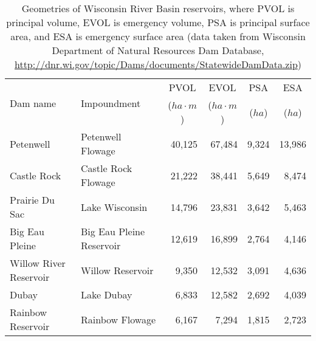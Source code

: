\begin{table}[h!]
	\caption[Geometries of Wisconsin River Basin reservoirs]{Geometries of Wisconsin River Basin reservoirs, where PVOL is principal volume, EVOL is emergency volume, PSA is principal surface area, and ESA is emergency surface area (data taken from Wisconsin Department of Natural Resources Dam Database, \url{http://dnr.wi.gov/topic/Dams/documents/StatewideDamData.zip})}
	\centering
	\begin{tabular}{llrrrr}
\hline
		\multirow{2}{*}{Dam  name} & \multirow{2}{*}{Impoundment}  & \multicolumn{1}{c}{PVOL}             & \multicolumn{1}{c}{EVOL}             & \multicolumn{1}{c}{PSA}    & \multicolumn{1}{c}{ESA}    \\
                                   &                               & \multicolumn{1}{c}{($ha \cdot m$)}   & \multicolumn{1}{c}{($ha \cdot m$)}   & \multicolumn{1}{c}{($ha$)} & \multicolumn{1}{c}{($ha$)} \\
\hline \hline
		Petenwell                  & Petenwell Flowage             & 40,125                               & 67,484                               & 9,324                      & 13,986                     \\
		Castle Rock                & Castle Rock Flowage           & 21,222                               & 38,441                               & 5,649                      & 8,474                      \\
		Prairie Du Sac             & Lake Wisconsin                & 14,796                               & 23,831                               & 3,642                      & 5,463                      \\
		Big Eau Pleine             & Big Eau Pleine Reservoir      & 12,619                               & 16,899                               & 2,764                      & 4,146                      \\
		Willow River Reservoir     & Willow Reservoir              & 9,350                                & 12,532                               & 3,091                      & 4,636                      \\
		Dubay                      & Lake Dubay                    & 6,833                                & 12,582                               & 2,692                      & 4,039                      \\
		Rainbow Reservoir          & Rainbow Flowage               & 6,167                                & 7,294                                & 1,815                      & 2,723                      \\

\end{tabular}
\end{table}
